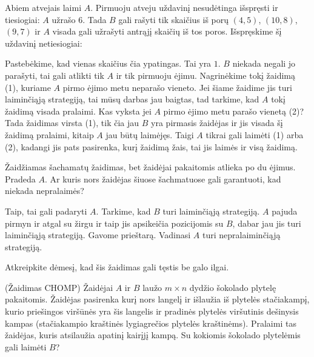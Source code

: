 \begin{sprendimas}
  Abiem atvejais laimi $A$. Pirmuoju atveju uždavinį nesudėtinga išspręsti
  ir tiesiogiai: $A$ užrašo $6$. Tada $B$ gali rašyti tik skaičius iš porų
  $(4,5)$, $(10,8)$, $(9,7)$ ir $A$ visada gali užrašyti antrąjį skaičių iš
  tos poros. Išspręskime šį uždavinį netiesiogiai:

  Pastebėkime, kad vienas skaičius čia ypatingas. Tai yra
  $1$. $B$ niekada negali jo parašyti, tai gali atlikti tik $A$ ir tik
  pirmuoju ėjimu. Nagrinėkime tokį žaidimą (1), kuriame $A$ pirmo ėjimo metu
  neparašo vieneto. Jei šiame žaidime jis turi laiminčiąją strategiją, tai
  mūsų darbas jau baigtas, tad tarkime, kad $A$ tokį žaidimą visada pralaimi.
  Kas vyksta jei $A$ pirmo ėjimo metu parašo vienetą (2)? Tada žaidimas virsta
  (1), tik čia jau $B$ yra pirmasis žaidėjas ir jis visada šį žaidimą
  pralaimi, kitaip $A$ jau būtų laimėjęs. Taigi $A$ tikrai gali laimėti (1)
  arba (2), kadangi jis pats pasirenka, kurį žaidimą žais, tai jis laimės ir
  visą žaidimą. 
\end{sprendimas}

\begin{pavnr}
  Žaidžiamas šachamatų žaidimas, bet žaidėjai pakaitomis atlieka po du
  ėjimus. Pradeda $A$. Ar kuris nors žaidėjas šiuose šachmatuose gali
  garantuoti, kad niekada nepralaimės? 
\end{pavnr}

\begin{sprendimas}
  Taip, tai gali padaryti $A$. Tarkime, kad $B$ turi laiminčiąją strategiją.
  $A$ pajuda pirmyn ir atgal su žirgu ir taip jis apsikeičia pozicijomis su
  $B$, dabar jau jis turi laiminčiąją strategiją. Gavome prieštarą. Vadinasi
  $A$ turi nepralaiminčiąją strategiją. 
\end{sprendimas}

\begin{pastaba}
  Atkreipkite dėmesį, kad šis žaidimas gali tęstis be galo ilgai.
\end{pastaba}

\begin{pavnr}{(Žaidimas CHOMP)}
  Žaidėjai $A$ ir $B$ laužo $m\times n$ dydžio šokolado plytelę pakaitomis.
  Žaidėjas pasirenka kurį nors langelį ir išlaužia iš plytelės stačiakampį,
  kurio priešingos viršūnės yra šis langelis ir pradinės plytelės
  viršutinis dešinysis kampas (stačiakampio kraštinės lygiagrečios plytelės
  kraštinėms).  Pralaimi tas žaidėjas, kuris atsilaužia apatinį kairįjį
  kampą. Su kokiomis šokolado plytelėmis gali laimėti $B$?
  \label{CHOMP}
\end{pavnr}

